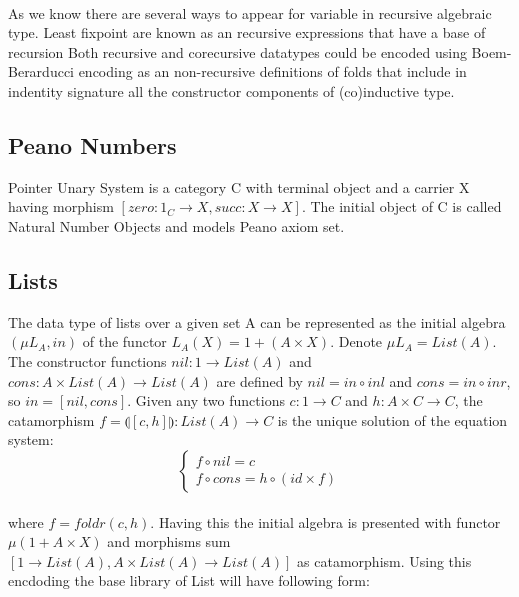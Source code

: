 \documentclass[11pt,oneside]{article}
\begin{document}
  \paragraph{}
  As we know there are several ways to appear for variable in recursive algebraic type.
  Least fixpoint are known as an recursive expressions that have a base of recursion
  Both recursive and corecursive datatypes could be encoded using Boem-Berarducci encoding
  as an non-recursive definitions of folds that include in indentity signature all the
  constructor components of (co)inductive type.

  \subsection{Peano Numbers}
  Pointer Unary System is a category C with terminal object
  and a carrier X having morphism $[zero: 1_C \rightarrow X,succ: X \rightarrow X]$.
  The initial object of C is called Natural Number Objects and models Peano axiom set.

\newpage
  \subsection{Lists}
  The data type of lists over a given set A can be represented as the initial algebra
  $(\mu L_A, in)$ of the functor $L_A(X) = 1 + (A \times X)$. Denote $\mu L_A = List(A)$.
  The constructor functions $nil: 1 \rightarrow List(A)$ and
  $cons: A \times List(A) \rightarrow List(A)$ are defined by
  $nil = in \circ inl$ and $cons = in \circ inr$, so $in = [nil,cons]$.
  Given any two functions $c: 1 \rightarrow C$ and $h: A \times C \rightarrow C$,
  the catamorphism $f = \llparenthesis [c,h] \rrparenthesis : List(A) \rightarrow C$
  is the unique solution of the equation system:
\vspace{0.3cm}
$$
\begin{cases}
  f \circ nil  = c \\
  f \circ cons = h \circ (id \times f)
\end{cases}
$$

\paragraph{}
  where $f = foldr(c,h)$. Having this the initial algebra is presented with functor
  $\mu (1 + A \times X)$ and morphisms sum $[1 \rightarrow List(A), A \times List(A) \rightarrow List(A)]$
  as catamorphism. Using this encdoding the base library of List will have following form:
\end{document}
